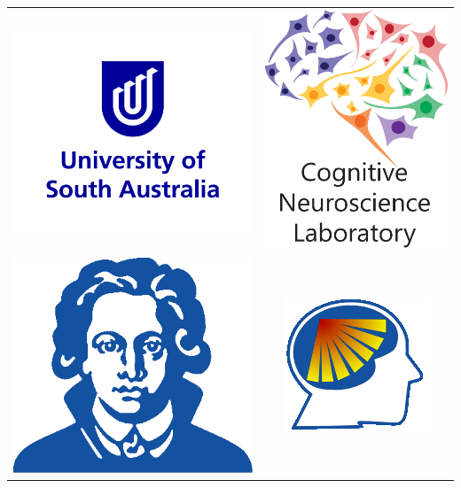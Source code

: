 \documentclass[final]{beamer}
\begin{document}
\begin{frame}{}
\begin{textblock}{18}
\begin{block}{}
\begin{tabular}{c c }
\includegraphics[width=.55\linewidth]{logo_unisa_RGB-blue.png} &   \includegraphics[width=.3\linewidth]{cnl-color.eps}  \\
\includegraphics[width=.4\linewidth]{logo_frankfurt_square.png} & \includegraphics[width=.4\linewidth]{logo_fiebach_lab.png} \\
\end{tabular}

\end{block}


\end{textblock}

\end{frame}
\end{document}
